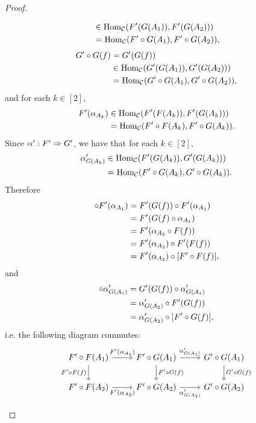 \documentclass{book}
\begin{document}
\begin{proof}
\begin{enumerate}
\begin{align*}
				& \in \operatorname{Hom}_{\mathcal{C}}(F'(G(A_1)), F'(G(A_2))) \\
				& = \operatorname{Hom}_{\mathcal{C}}(F' \circ G(A_1), F' \circ G(A_2)),
			\end{align*}
			\begin{align*}
				G' \circ G(f)
				& = G'(G(f)) \\
				& \in \operatorname{Hom}_{\mathcal{C}}(G'(G(A_1)), G'(G(A_2))) \\
				& = \operatorname{Hom}_{\mathcal{C}}(G' \circ G(A_1), G' \circ G(A_2)),
			\end{align*}
			and for each $k \in [2]$, 
			\begin{align*}
				F'(\alpha_{A_k}) 
				& \in \operatorname{Hom}_{\mathcal{C}}(F'(F(A_k)), F'(G(A_k))) \\
				& = \operatorname{Hom}_{\mathcal{C}}(F' \circ F(A_k), F' \circ G(A_k)).
			\end{align*}
			Since $\alpha': F' \Rightarrow G'$, we have that for each $k \in [2]$, 
			\begin{align*}
				\alpha'_{G(A_k)}
				& \in \operatorname{Hom}_{\mathcal{C}}(F'(G(A_k)), G'(G(A_k))) \\
				& = \operatorname{Hom}_{\mathcal{C}}(F' \circ G(A_k), G' \circ G(A_k)).
			\end{align*}
			Therefore 
			\begin{align*}
				[F' \circ G (f)] \circ F'(\al_{A_1})
				& = F'(G(f)) \circ F'(\al_{A_1}) \\
				& = F'(G(f) \circ \al_{A_1}) \\
				& = F'(\al_{A_2} \circ F(f)) \\
				& = F'(\al_{A_2}) \circ F'(F(f)) \\
				& = F'(\al_{A_2}) \circ [F' \circ F(f)],
			\end{align*}
			and 
			\begin{align*}
				[G' \circ G(f)] \circ \al'_{G(A_1)}
				& = G'(G(f)) \circ \al'_{G(A_1)} \\
				& = \al'_{G(A_2)} \circ F'(G(f)) \\
				& =  \al'_{G(A_2)} \circ [F' \circ G(f)],
			\end{align*}
			i.e. the following diagram commutes: 
			\[ 
			\begin{tikzcd}
				F' \circ F(A_1)  \arrow[r, "F'(\al_{A_1})"]  \arrow[d, "F' \circ F(f)"']  & F' \circ G(A_1)   \arrow[d, "F' \circ G(f)"] \arrow[r, "\al'_{G(A_1)}"]    & G' \circ G(A_1)   \arrow[d, "G' \circ G(f)"] \\
				F' \circ F(A_2) \arrow[r, "F'(\al_{A_2})"'] &  F' \circ G(A_2) \arrow[r, "\al'_{G(A_2)}"'] &  G' \circ G(A_2) 
			\end{tikzcd}
			\] 

\end{enumerate}
\end{proof}
\end{document}
